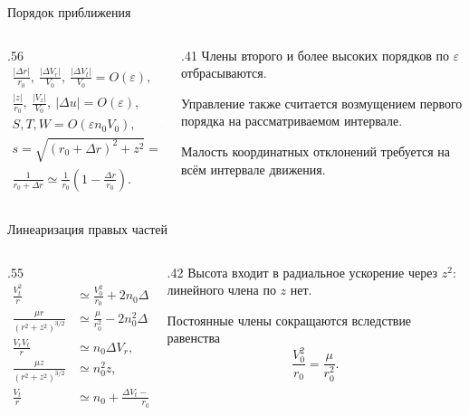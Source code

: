 \documentclass[11pt,aspectratio=169,t]{beamer}
\newcommand{\eqcompact}{\fontsize{10}{12}\selectfont}
\begin{document}
\begin{frame}{Порядок приближения}
\relax
\begin{columns}[T,onlytextwidth]
\begin{column}{.56\textwidth}
{\derivationmathspacing
\[
\begin{gathered}
 \frac{|\Delta r|}{r_0},\ \frac{|\Delta V_r|}{V_0},\ \frac{|\Delta V_t|}{V_0}
       =O(\varepsilon),\\[7pt]
 \frac{|z|}{r_0},\ \frac{|V_z|}{V_0},\ |\Delta u|=O(\varepsilon),\\[7pt]
 S,T,W=O(\varepsilon n_0V_0),\qquad \varepsilon\ll1.
\end{gathered}
\]
\[
\begin{gathered}
 s=\sqrt{(r_0+\Delta r)^2+z^2}
   =r_0+\Delta r+O(\varepsilon^2r_0),\\[5pt]
 \frac{1}{r_0+\Delta r}
   \simeq\frac{1}{r_0}\left(1-\frac{\Delta r}{r_0}\right).
\end{gathered}
\]
}
\end{column}
\begin{column}{.41\textwidth}
\RaggedRight
Члены второго и более высоких порядков по $\varepsilon$ отбрасываются.\par\medskip
Управление также считается возмущением первого порядка на рассматриваемом интервале.\par\medskip
Малость координатных отклонений требуется на всём интервале движения.
\end{column}
\end{columns}
\end{frame}

\begin{frame}{Линеаризация правых частей}
\relax
\begin{columns}[T,onlytextwidth]
\begin{column}{.55\textwidth}
{\eqcompact\derivationmathspacing
\[
\begin{aligned}
 \frac{V_t^2}{r}
 &\simeq\frac{V_0^2}{r_0}+2n_0\Delta V_t-n_0^2\Delta r,\\[6pt]
 \frac{\mu r}{(r^2+z^2)^{3/2}}
 &\simeq\frac{\mu}{r_0^2}-2n_0^2\Delta r,\\[6pt]
 \frac{V_rV_t}{r}&\simeq n_0\Delta V_r,\\[6pt]
 \frac{\mu z}{(r^2+z^2)^{3/2}}&\simeq n_0^2z,\\[6pt]
 \frac{V_t}{r}&\simeq n_0+\frac{\Delta V_t-n_0\Delta r}{r_0}.
\end{aligned}
\]
}
\end{column}
\begin{column}{.42\textwidth}
\RaggedRight
Высота входит в радиальное ускорение через $z^2$: линейного члена по $z$ нет.\par\medskip
Постоянные члены сокращаются вследствие равенства
\[
 \frac{V_0^2}{r_0}=\frac{\mu}{r_0^2}.
\]
\end{column}
\end{columns}
\end{frame}
\end{document}
